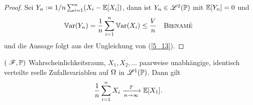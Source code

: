 \begin{proof}
	Sei $Y_n := 1/n \sum_{i=1}^n (X_i - \mathbb{E}[X_i])$, dann ist $Y_n \in \mathscr{L}^{2}(\mathbb{P})$ mit $\mathbb{E}[Y_n] = 0$ und
	\begin{align*}
		\mathbb{V}\text{ar}(Y_n) = \frac{1}{n} \sum_{i=1}^n \mathbb{V}\text{ar}(X_i) \le \frac{V}{n} \quad \text{\textsc{Bienamé}} 
	\end{align*}
	und  die Aussage folgt aus der Ungleichung von  (\cref{5_13}).
\end{proof}
\begin{proposition}
	$(\; \mathscr F, \mathbb{P})$ Wahrscheinlichkeitsraum, $X_1, X_2, \dots$ paarweise unabhängige, identisch verteilte reelle Zufallsvariablen auf $\Omega$ in $\mathscr{L}^{1}(\mathbb{P})$. Dann gilt
	\begin{align*}
		\frac{1}{n} \sum_{i=1}^n X_i \xrightarrow[n \to \infty]{\mathbb{P}} \mathbb{E}[X_1].
	\end{align*}
\end{proposition}
